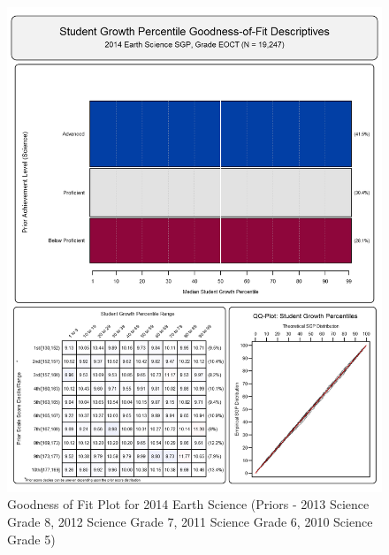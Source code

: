 \documentclass[12pt]{article}
\begin{document}
\begin{figure}[htbp]
\centering
\includegraphics{../img/Goodness_of_Fit/EARTH_SCIENCE.2014/2014_EARTH_SCIENCE_EOCT;2013_SCIENCE_8;2012_SCIENCE_7;2011_SCIENCE_6;2010_SCIENCE_5.png}
\caption{Goodness of Fit Plot for 2014 Earth Science (Priors - 2013
Science Grade 8, 2012 Science Grade 7, 2011 Science Grade 6, 2010
Science Grade 5)}
\end{figure}
\end{document}
